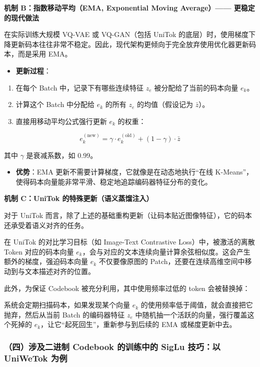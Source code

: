 \textbf{机制 B：指数移动平均（EMA, Exponential Moving Average）------ 更稳定的现代做法}

在实际训练大规模 VQ-VAE 或 VQ-GAN（包括 UniTok 的底层）时，使用梯度下降更新码本往往非常不稳定。因此，现代架构更倾向于完全放弃使用优化器更新码本，而是采用 EMA。

\begin{itemize}
\tightlist
\item
  \textbf{更新过程}：
\end{itemize}

\begin{enumerate}
\def\labelenumi{\arabic{enumi}.}
\tightlist
\item
  在每个 Batch 中，记录下有哪些连续特征 \(z_e\) 被分配给了当前的码本向量 \(e_k\)。
\item
  计算这个 Batch 中分配给 \(e_k\) 的所有 \(z_e\) 的均值（假设记为 \(\bar z\)）。
\item
  直接用移动平均公式强行更新 \(e_k\) 的权重：
\end{enumerate}

\[
e_k^{(\mathrm{new})}
=\gamma\cdot e_k^{(\mathrm{old})}+(1-\gamma)\cdot\bar z
\]

其中 \(\gamma\) 是衰减系数，如 0.99。

\begin{itemize}
\tightlist
\item
  \textbf{优势}：EMA 更新不需要计算梯度，它就像是在动态地执行``在线 K-Means''，使得码本向量能非常平滑、稳定地追踪编码器特征分布的变化。
\end{itemize}

\textbf{机制 C：UniTok 的特殊更新（语义蒸馏注入）}

对于 UniTok 而言，除了上述的基础重构更新（让码本贴近图像特征），它的码本还承受着语义对齐的任务。

在 UniTok 的对比学习目标（如 Image-Text Contrastive Loss）中，被激活的离散 Token 对应的码本向量 \(e_k\)，会与对应的文本连续向量计算余弦相似度。这会产生额外的梯度，强迫码本向量 \(e_k\) 不仅要像原图的 Patch，还要在连续高维空间中移动到与文本描述对齐的位置。

此外，为保证 Codebook 被充分利用，其中使用频率过低的 token 会被替换掉：

系统会定期扫描码本，如果发现某个向量 \(e_k\) 的使用频率低于阈值，就会直接把它抛弃，然后从当前 Batch 的编码器特征 \(z_e\) 中随机抽一个活跃的向量，强行覆盖这个死掉的 \(e_k\)，让它``起死回生''，重新参与到后续的 EMA 或梯度更新中去。

\hypertarget{ux56dbux6d89ux53caux4e8cux8fdbux5236-codebook-ux7684ux8badux7ec3ux4e2dux7684-siglu-ux6280ux5de7ux4ee5-uniwetok-ux4e3aux4f8b}{%
\subsubsection{（四）涉及二进制 Codebook 的训练中的 SigLu 技巧：以 UniWeTok 为例}\label{ux56dbux6d89ux53caux4e8cux8fdbux5236-codebook-ux7684ux8badux7ec3ux4e2dux7684-siglu-ux6280ux5de7ux4ee5-uniwetok-ux4e3aux4f8b}}

